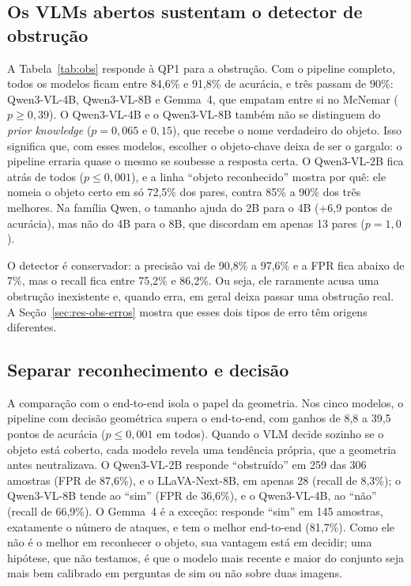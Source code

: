 \documentclass[conference]{IEEEtran}
\begin{document}
\subsection{Os VLMs abertos sustentam o detector de obstrução}
A Tabela~\ref{tab:obs} responde à QP1 para a obstrução. Com o pipeline completo, todos os modelos ficam
entre 84,6\% e 91,8\% de acurácia, e três passam de 90\%: Qwen3-VL-4B, Qwen3-VL-8B e Gemma~4, que
empatam entre si no McNemar ($p\geq 0{,}39$). O Qwen3-VL-4B e o Qwen3-VL-8B também não se distinguem do
\emph{prior knowledge} ($p=0{,}065$ e $0{,}15$), que recebe o nome verdadeiro do objeto. Isso significa que,
com esses modelos, escolher o objeto-chave deixa de ser o gargalo: o pipeline erraria quase o mesmo se
soubesse a resposta certa. O Qwen3-VL-2B fica atrás de todos ($p\leq 0{,}001$), e a linha ``objeto
reconhecido'' mostra por quê: ele nomeia o objeto certo em só 72,5\% dos pares, contra 85\% a 90\% dos
três melhores. Na família Qwen, o tamanho ajuda do 2B para o 4B (+6,9 pontos de acurácia), mas não do 4B
para o 8B, que discordam em apenas 13 pares ($p=1{,}0$).

O detector é conservador: a precisão vai de 90,8\% a 97,6\% e a FPR fica abaixo de 7\%, mas o recall fica
entre 75,2\% e 86,2\%. Ou seja, ele raramente acusa uma obstrução inexistente e, quando erra, em geral
deixa passar uma obstrução real. A Seção~\ref{sec:res-obs-erros} mostra que esses dois tipos de erro têm
origens diferentes.

\subsection{Separar reconhecimento e decisão}
A comparação com o end-to-end isola o papel da geometria. Nos cinco modelos, o pipeline com decisão
geométrica supera o end-to-end, com ganhos de 8,8 a 39,5 pontos de acurácia ($p\leq 0{,}001$ em todos).
Quando o VLM decide sozinho se o objeto está coberto, cada modelo revela uma tendência própria, que a
geometria antes neutralizava. O Qwen3-VL-2B responde ``obstruído'' em 259 das 306 amostras (FPR de
87,6\%), e o LLaVA-Next-8B, em apenas 28 (recall de 8,3\%); o Qwen3-VL-8B tende ao ``sim'' (FPR de
36,6\%), e o Qwen3-VL-4B, ao ``não'' (recall de 66,9\%). O Gemma~4 é a exceção: responde ``sim'' em 145
amostras, exatamente o número de ataques, e tem o melhor end-to-end (81,7\%). Como ele não é o melhor em
reconhecer o objeto, sua vantagem está em decidir; uma hipótese, que não testamos, é que o modelo mais
recente e maior do conjunto seja mais bem calibrado em perguntas de sim ou não sobre duas imagens.
\end{document}
